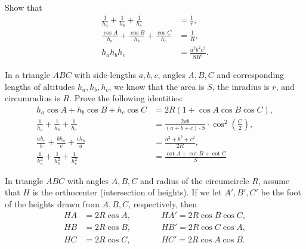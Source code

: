 \begin{question}
    Show that
    \begin{align*}
        \frac{1}{h_a}+\frac{1}{h_b}+\frac{1}{h_c} &= \frac{1}{r},\\
        \frac{\cos A}{h_a}+\frac{\cos B}{h_b}+\frac{\cos C}{h_c} &=\frac{1}{R},\\
        h_ah_bh_c &= \frac{a^2b^2c^2}{8R^3}.
    \end{align*}
\end{question}

\begin{question}[name={Identities on Lengths of Heights}]
In a triangle $ABC$ with side-lengths $a,b,c$, angles $A,B,C$ and corresponding lengths of altitudes $h_a,h_b,h_c$, we know that the area is $S$, the inradius is $r$, and circumradius is $R$. Prove the following identities:
\begin{align*}
    h_a\cos A + h_b\cos B + h_c\cos C &= 2R(1+\cos A \cos B \cos C),\\
    \frac{1}{h_a}+\frac{1}{h_b}+\frac{1}{h_c} &=\frac{2ab}{(a+b+c)\cdot S}\cdot \cos^2\left(\frac{C}{2}\right),\\
    \frac{ah_c}{b}+\frac{bh_a}{c}+\frac{ch_b}{a} &= \frac{a^2+b^2+c^2}{2R},\\
    \frac{1}{h_a^2}+\frac{1}{h_b^2}+\frac{1}{h_c^2} &=\frac{\cot A + \cot B + \cot C}{S}
    \end{align*}
\end{question}

    \begin{question}[name=Calculating Distance from Orthocenter]
        In triangle $ABC$ with angles $A,B,C$ and radius of the circumcircle $R$, assume that $H$ is the orthocenter (intersection of heights). If we let $A',B',C'$ be the foot of the heights drawn from $A,B,C$, respectively, then
        \begin{align*}
            HA &= 2R \cos A, \qquad && HA' = 2R \cos B \cos C,\\
            HB &= 2R \cos B, \qquad && HB' = 2R \cos C \cos A,\\
            HC &= 2R \cos C, \qquad && HC' = 2R \cos A \cos B.
        \end{align*}
    \end{question}

